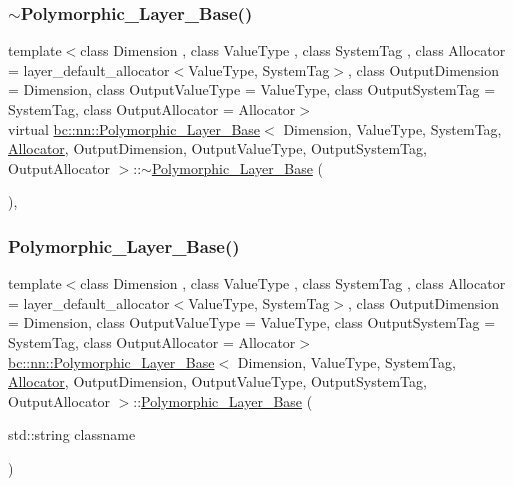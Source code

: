 \subsubsection{\texorpdfstring{$\sim$\+Polymorphic\+\_\+\+Layer\+\_\+\+Base()}{~Polymorphic\_Layer\_Base()}\hspace{0.1cm}{\footnotesize\ttfamily [1/2]}}
{\footnotesize\ttfamily template$<$class Dimension , class Value\+Type , class System\+Tag , class Allocator  = layer\+\_\+default\+\_\+allocator$<$\+Value\+Type, System\+Tag$>$, class Output\+Dimension  = Dimension, class Output\+Value\+Type  = Value\+Type, class Output\+System\+Tag  = System\+Tag, class Output\+Allocator  = Allocator$>$ \\
virtual \hyperlink{structbc_1_1nn_1_1Polymorphic__Layer__Base}{bc\+::nn\+::\+Polymorphic\+\_\+\+Layer\+\_\+\+Base}$<$ Dimension, Value\+Type, System\+Tag, \hyperlink{classbc_1_1allocators_1_1Allocator}{Allocator}, Output\+Dimension, Output\+Value\+Type, Output\+System\+Tag, Output\+Allocator $>$\+::$\sim$\hyperlink{structbc_1_1nn_1_1Polymorphic__Layer__Base}{Polymorphic\+\_\+\+Layer\+\_\+\+Base} (\begin{DoxyParamCaption}{ }\end{DoxyParamCaption})\hspace{0.3cm}{\ttfamily [virtual]}, {\ttfamily [default]}}

\mbox{\label{structbc_1_1nn_1_1Polymorphic__Layer__Base_a1b02e9a8e1b085c3b1eda984de21ce93}} 
\subsubsection{\texorpdfstring{Polymorphic\+\_\+\+Layer\+\_\+\+Base()}{Polymorphic\_Layer\_Base()}\hspace{0.1cm}{\footnotesize\ttfamily [2/2]}}
{\footnotesize\ttfamily template$<$class Dimension , class Value\+Type , class System\+Tag , class Allocator  = layer\+\_\+default\+\_\+allocator$<$\+Value\+Type, System\+Tag$>$, class Output\+Dimension  = Dimension, class Output\+Value\+Type  = Value\+Type, class Output\+System\+Tag  = System\+Tag, class Output\+Allocator  = Allocator$>$ \\
\hyperlink{structbc_1_1nn_1_1Polymorphic__Layer__Base}{bc\+::nn\+::\+Polymorphic\+\_\+\+Layer\+\_\+\+Base}$<$ Dimension, Value\+Type, System\+Tag, \hyperlink{classbc_1_1allocators_1_1Allocator}{Allocator}, Output\+Dimension, Output\+Value\+Type, Output\+System\+Tag, Output\+Allocator $>$\+::\hyperlink{structbc_1_1nn_1_1Polymorphic__Layer__Base}{Polymorphic\+\_\+\+Layer\+\_\+\+Base} (\begin{DoxyParamCaption}\item[{std\+::string}]{classname }\end{DoxyParamCaption})\hspace{0.3cm}{\ttfamily [inline]}}

